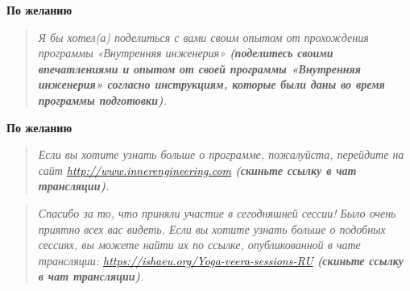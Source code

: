 \textbf{По желанию}
\begin{quote}\emph{
Я бы хотел(а) поделиться с вами своим опытом от прохождения программы «Внутренняя инженерия»
\textbf{(поделитесь своими впечатлениями и опытом от своей программы
«Внутренняя инженерия» согласно инструкциям, которые были даны во
время программы подготовки)}.
}\end{quote}

\textbf{По желанию}
\begin{quote}\emph{
Если вы хотите узнать больше о программе, пожалуйста, перейдите на сайт \href{http://www.innerengineering.com}{\small http://www.innerengineering.com} \textbf{(скиньте ссылку в чат трансляции)}. 
}\end{quote}

\begin{quote}\emph{
Спасибо за то, что приняли участие в сегодняшней сессии! Было очень приятно всех вас видеть. Если вы хотите узнать больше о подобных сессиях, вы можете найти их по ссылке, опубликованной в чате трансляции: \href{https://ishaeu.org/Yoga-veera-sessions-RU}{\small https://ishaeu.org/Yoga-veera-sessions-RU} \textbf{(скиньте ссылку в чат трансляции)}. 
}\end{quote}

